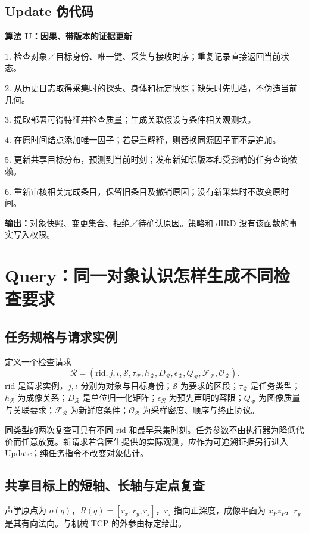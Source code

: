 \documentclass[UTF8,11pt,a4paper,fontset=fandol]{ctexart}
\numberwithin{equation}{section}
\theoremstyle{definition}
\begin{document}
\subsection{Update 伪代码}
\begin{keybox}\small
\textbf{算法 U：因果、带版本的证据更新}\par
1. 检查对象／目标身份、唯一键、采集与接收时序；重复记录直接返回当前状态。\par
2. 从历史日志取得采集时的探头、身体和标定快照；缺失时先归档，不伪造当前几何。\par
3. 提取部署可得特征并检查质量；生成关联假设与条件相关观测块。\par
4. 在原时间结点添加唯一因子；若是重解释，则替换同源因子而不是追加。\par
5. 更新共享目标分布，预测到当前时刻；发布新知识版本和受影响的任务查询依赖。\par
6. 重新审核相关完成条目，保留旧条目及撤销原因；没有新采集时不改变原时间。\par
\textbf{输出：}对象快照、变更集合、拒绝／待确认原因。策略和 dIRD 没有该函数的事实写入权限。
\end{keybox}

\section{Query：同一对象认识怎样生成不同检查要求}
\label{sec:query}
\subsection{任务规格与请求实例}
定义一个检查请求
\begin{equation}
\mathcal R=(\mathrm{rid},j,\iota,\mathcal S,\tau_{\mathcal R},h_{\mathcal R},
D_{\mathcal R},\epsilon_{\mathcal R},Q_{\mathcal R},\mathcal F_{\mathcal R},\mathcal O_{\mathcal R}).
\label{eq:taskspec}
\end{equation}
$\mathrm{rid}$ 是请求实例，$j,\iota$ 分别为对象与目标身份；$\mathcal S$ 为要求的区段；$\tau_{\mathcal R}$ 是任务类型；$h_{\mathcal R}$ 为成像关系；$D_{\mathcal R}$ 是单位归一化矩阵；$\epsilon_{\mathcal R}$ 为预先声明的容限；$Q_{\mathcal R}$ 为图像质量与关联要求；$\mathcal F_{\mathcal R}$ 为新鲜度条件；$\mathcal O_{\mathcal R}$ 为采样密度、顺序与终止协议。

同类型的两次复查可具有不同 $\mathrm{rid}$ 和最早采集时刻。任务参数不由执行器为降低代价而任意放宽。新请求若含医生提供的实际观测，应作为可追溯证据另行进入 Update；纯任务指令不改变对象估计。

\subsection{共享目标上的短轴、长轴与定点复查}
声学原点为 $o(q)$，$R(q)=[r_x,r_y,r_z]$，$r_z$ 指向正深度，成像平面为 $x_Pz_P$，$r_y$ 是其有向法向。与机械 TCP 的外参由标定给出。
\end{document}
